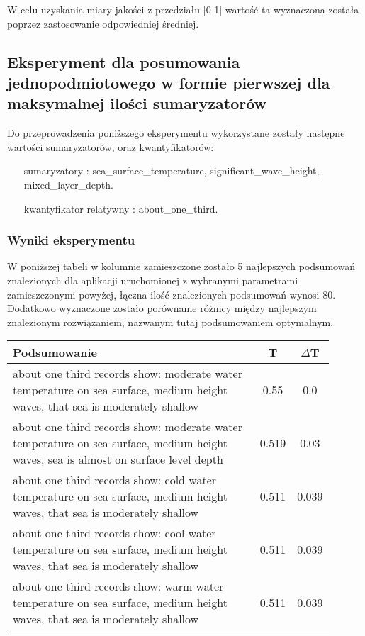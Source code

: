 \documentclass{article}
\begin{document}
\noindent W celu uzyskania miary jakości z przedziału [0-1] wartość ta wyznaczona została poprzez zastosowanie odpowiedniej średniej.


\subsection{Eksperyment dla posumowania jednopodmiotowego w formie pierwszej dla maksymalnej ilości sumaryzatorów}

Do przeprowadzenia poniższego eksperymentu wykorzystane zostały następne wartości sumaryzatorów, oraz kwantyfikatorów:

\begin{itemize}
    \item[sumaryzatory]: sea\_surface\_temperature, significant\_wave\_height, mixed\_layer\_depth.
    \item[kwantyfikator relatywny]: about\_one\_third.
\end{itemize}

\subsubsection{Wyniki eksperymentu}

\noindent W poniższej tabeli w kolumnie zamieszczone zostało 5 najlepszych podsumowań znalezionych dla aplikacji uruchomionej z wybranymi parametrami zamieszczonymi powyżej, łączna ilość znalezionych podsumowań wynosi 80. Dodatkowo wyznaczone zostało porównanie różnicy między najlepszym znalezionym rozwiązaniem, nazwanym tutaj podsumowaniem optymalnym.

\begin{longtable}{|p{0.9\linewidth}|c|c|}
\hline
\textbf{Podsumowanie} & \textbf{T} & \textbf{\(\Delta \)T} \\
\hline
about one third records show: moderate water temperature on sea surface, medium height waves, that sea is moderately shallow & 0.55 & 0.0 \\ \hline
about one third records show: moderate water temperature on sea surface, medium height waves, sea is almost on surface level depth & 0.519 & 0.03 \\ \hline
about one third records show: cold water temperature on sea surface, medium height waves, that sea is moderately shallow & 0.511 & 0.039 \\ \hline
about one third records show: cool water temperature on sea surface, medium height waves, that sea is moderately shallow & 0.511 & 0.039 \\ \hline
about one third records show: warm water temperature on sea surface, medium height waves, that sea is moderately shallow & 0.511 & 0.039 \\ \hline
\hline
\end{longtable}
\end{document}
